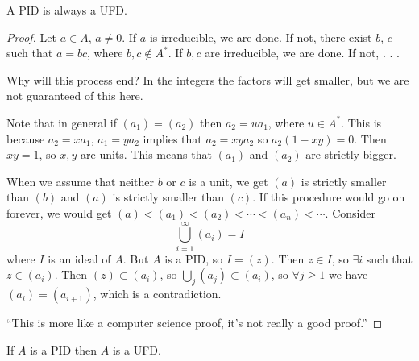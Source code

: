 \begin{theorem}
A PID is always a UFD.
\end{theorem}
\begin{proof}
Let $a \in A$, $a \neq 0$. If $a$ is irreducible, we are done. If not,
there exist $b$, $c$ such that $a = bc$, where $b, c \notin
A^\ast$. If $b, c$ are irreducible, we are done. If not, . . .

Why will this process end? In the integers the factors will get
smaller, but we are not guaranteed of this here.

Note that in general if $(a_1) = (a_2)$ then $a_2 = u a_1$, where
$u \in A^\ast$. This is because $a_2 = x a_1$, $a_1 = y a_2$ implies
that $a_2 = xya_2$ so $a_2(1 - xy) = 0$. Then $xy = 1$, so $x, y$ are
units. This means that $(a_1)$ and $(a_2)$ are strictly bigger.

When we assume that neither $b$ or $c$ is a unit, we get
$(a)$ is strictly smaller than $(b)$ and $(a)$ is strictly smaller
than $(c)$. If this procedure would go on forever, we would get
$(a) < (a_1) < (a_2) < \cdots < (a_n) < \cdots$. Consider
$$
\bigcup_{i=1}^\infty (a_i) = I
$$
where $I$ is an ideal of $A$. But $A$ is a PID, so $I = (z)$.
Then $z \in I$, so $\exists i$ such that $z \in (a_i)$.
Then $(z) \subset (a_i)$, so $\bigcup_j (a_j) \subset (a_i)$, so
$\forall j \geq 1$ we have $(a_i) = (a_{i+1})$, which is a
contradiction.

``This is more like a computer science proof, it's not really a good proof.''
\end{proof}

\begin{Theorem}
If $A$ is a PID then $A$ is a UFD.
\end{Theorem}

